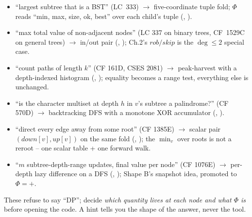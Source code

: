 \begin{itemize}[nosep, leftmargin=1.4em]
  \item ``largest subtree that is a BST'' (LC~333) $\longrightarrow$
        five-coordinate tuple fold; $\Phi$ reads
        ``min, max, size, ok, best'' over each child's tuple
        (, ).
  \item ``max total value of non-adjacent nodes'' (LC 337 on binary
        trees, CF~1529C on general trees) $\longrightarrow$ in/out pair
        (, ); Ch.2's
        $\mathit{rob}/\mathit{skip}$ is the $\deg\le 2$ special case.
  \item ``count paths of length $k$'' (CF 161D, CSES 2081)
        $\longrightarrow$ peak-harvest with a depth-indexed histogram
        (, ); equality becomes a
        range test, everything else is unchanged.
  \item ``is the character multiset at depth $h$ in $v$'s subtree a
        palindrome?'' (CF 570D) $\longrightarrow$ backtracking DFS with
        a monotone XOR accumulator (,
        ).
  \item ``direct every edge away from some root'' (CF 1385E)
        $\longrightarrow$ scalar pair $(\mathit{down}[v],\mathit{up}[v])$
        on the same fold (, );
        the $\min_v$ over roots is not a reroot -- one scalar table +
        one forward walk.
  \item ``$m$ subtree-depth-range updates, final value per node''
        (CF 1076E) $\longrightarrow$ per-depth lazy difference on a DFS
        (, ); Shape B's
        snapshot idea, promoted to $\Phi=+$.
\end{itemize}


These refuse to say ``DP''; decide \emph{which quantity lives at each
node and what $\Phi$ is} before opening the code. A hint tells you the
shape of the answer, never the tool.


